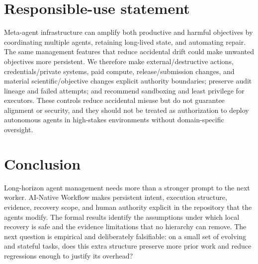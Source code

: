 \documentclass{article}
\begin{document}
\section{Responsible-use statement}
Meta-agent infrastructure can amplify both productive and harmful objectives by coordinating multiple agents, retaining long-lived state, and automating repair. The same management features that reduce accidental drift could make unwanted objectives more persistent. We therefore make external/destructive actions, credentials/private systems, paid compute, release/submission changes, and material scientific/objective changes explicit authority boundaries; preserve audit lineage and failed attempts; and recommend sandboxing and least privilege for executors. These controls reduce accidental misuse but do not guarantee alignment or security, and they should not be treated as authorization to deploy autonomous agents in high-stakes environments without domain-specific oversight.

\section{Conclusion}
Long-horizon agent management needs more than a stronger prompt to the next worker. AI-Native Workflow makes persistent intent, execution structure, evidence, recovery scope, and human authority explicit in the repository that the agents modify. The formal results identify the assumptions under which local recovery is safe and the evidence limitations that no hierarchy can remove. The next question is empirical and deliberately falsifiable: on a small set of evolving and stateful tasks, does this extra structure preserve more prior work and reduce regressions enough to justify its overhead?



\end{document}
